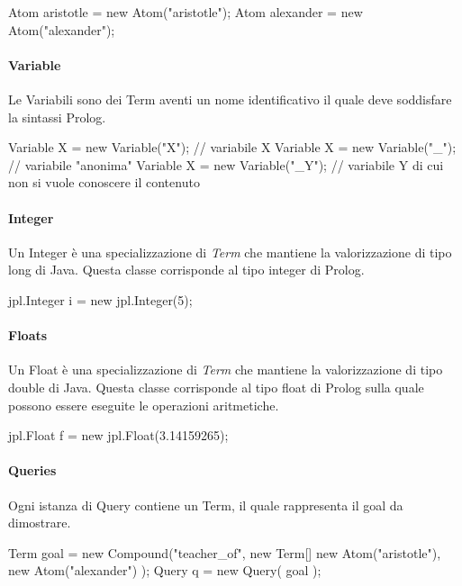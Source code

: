\begin{javacode}
Atom aristotle = new Atom("aristotle");
Atom alexander = new Atom("alexander");
\end{javacode}

\paragraph{Variable}
Le Variabili sono dei Term aventi un nome identificativo il quale deve soddisfare la sintassi Prolog.

\begin{javacode}
Variable X = new Variable("X"); //  variabile X
Variable X = new Variable("_"); //  variabile "anonima"
Variable X = new Variable("_Y"); // variabile Y di cui non si vuole conoscere il contenuto
\end{javacode}

\paragraph{Integer}
Un Integer è una specializzazione di \emph{Term} che mantiene la valorizzazione di tipo long di Java. Questa classe corrisponde al tipo integer di Prolog.

\begin{javacode}
jpl.Integer i = new jpl.Integer(5);
\end{javacode}

\paragraph{Floats}
Un Float è una specializzazione di \emph{Term} che mantiene la valorizzazione di tipo double di Java. Questa classe corrisponde al tipo float di Prolog sulla quale possono essere eseguite le operazioni aritmetiche.

\begin{javacode}
  jpl.Float f = new jpl.Float(3.14159265);
\end{javacode}

\paragraph{Queries}
Ogni istanza di Query contiene un Term, il quale rappresenta il goal da dimostrare.

\begin{javacode}
	Term goal = new Compound("teacher_of",
	new Term[] {
		new Atom("aristotle"),
		new Atom("alexander")
	}
	);
  Query q = new Query( goal );
\end{javacode}

